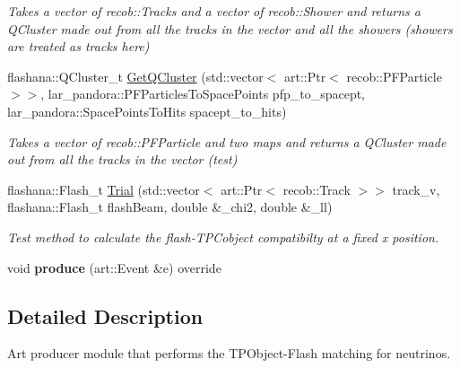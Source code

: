 \begin{DoxyCompactItemize}
\begin{DoxyCompactList}\small\item\em Takes a vector of recob\-::\-Tracks and a vector of recob\-::\-Shower and returns a Q\-Cluster made out from all the tracks in the vector and all the showers (showers are treated as tracks here) \end{DoxyCompactList}\item 
\hypertarget{classNeutrinoFlashMatch_a93132a117b6ea907ba95bba4a6af6107}{flashana\-::\-Q\-Cluster\-\_\-t \hyperlink{classNeutrinoFlashMatch_a93132a117b6ea907ba95bba4a6af6107}{Get\-Q\-Cluster} (std\-::vector$<$ art\-::\-Ptr$<$ recob\-::\-P\-F\-Particle $>$$>$, lar\-\_\-pandora\-::\-P\-F\-Particles\-To\-Space\-Points pfp\-\_\-to\-\_\-spacept, lar\-\_\-pandora\-::\-Space\-Points\-To\-Hits spacept\-\_\-to\-\_\-hits)}\label{classNeutrinoFlashMatch_a93132a117b6ea907ba95bba4a6af6107}

\begin{DoxyCompactList}\small\item\em Takes a vector of recob\-::\-P\-F\-Particle and two maps and returns a Q\-Cluster made out from all the tracks in the vector (test) \end{DoxyCompactList}\item 
\hypertarget{classNeutrinoFlashMatch_aa957152a8c232e4b23cc7544aa6bfdd1}{flashana\-::\-Flash\-\_\-t \hyperlink{classNeutrinoFlashMatch_aa957152a8c232e4b23cc7544aa6bfdd1}{Trial} (std\-::vector$<$ art\-::\-Ptr$<$ recob\-::\-Track $>$$>$ track\-\_\-v, flashana\-::\-Flash\-\_\-t flash\-Beam, double \&\-\_\-chi2, double \&\-\_\-ll)}\label{classNeutrinoFlashMatch_aa957152a8c232e4b23cc7544aa6bfdd1}

\begin{DoxyCompactList}\small\item\em Test method to calculate the flash-\/\-T\-P\-Cobject compatibilty at a fixed x position. \end{DoxyCompactList}\item 
\hypertarget{classNeutrinoFlashMatch_a00578af5672ff925f80c1b9482c8b4ff}{void {\bfseries produce} (art\-::\-Event \&e) override}\label{classNeutrinoFlashMatch_a00578af5672ff925f80c1b9482c8b4ff}

\end{DoxyCompactItemize}


\subsection{Detailed Description}
Art producer module that performs the T\-P\-Object-\/\-Flash matching for neutrinos. 

